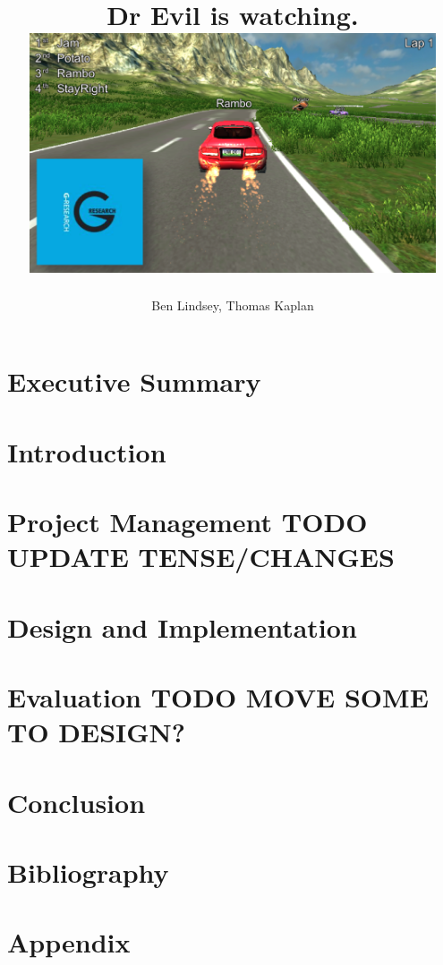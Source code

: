 \documentclass[11pt]{report}
\title{	
  {\huge \project}\\
  {\large Dr Evil is watching.}\\[2em]
  {\centering \includegraphics[width=0.9\textwidth]{coverpic.png}}
}
\author{Ben Lindsey, Thomas Kaplan}
\begin{document}
\maketitle

\chapter*{Executive Summary}


\tableofcontents

\chapter{Introduction}


\chapter{Project Management TODO UPDATE TENSE/CHANGES}


\chapter{Design and Implementation}


\chapter{Evaluation TODO MOVE SOME TO DESIGN?}


\chapter{Conclusion}


\chapter{Bibliography}
\printbibliography[heading=none]

\appendix
\chapter{Appendix}

\end{document}
